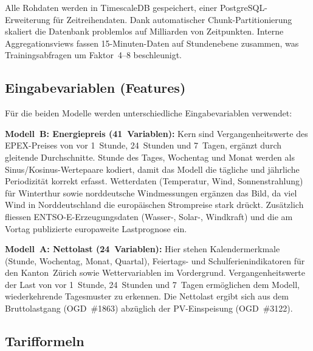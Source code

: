 \documentclass[sigconf]{acmart}
\begin{document}
Alle Rohdaten werden in TimescaleDB gespeichert, einer
PostgreSQL-Erweiterung f\"ur Zeitreihendaten.
Dank automatischer Chunk-Partitionierung skaliert die Datenbank
problemlos auf Milliarden von Zeitpunkten.
Interne Aggregationsviews fassen 15-Minuten-Daten auf Stunden\-ebene zusammen,
was Trainingsabfragen um Faktor~4--8 beschleunigt.

\subsection{Eingabevariablen (Features)}

F\"ur die beiden Modelle werden unterschiedliche Eingabevariablen verwendet:

\textbf{Modell~B: Energiepreis (41~Variablen):}
Kern sind Vergangenheitswerte des EPEX-Preises von vor 1~Stunde, 24~Stunden
und 7~Tagen, erg\"anzt durch gleitende Durchschnitte.
Stunde des Tages, Wochentag und Monat werden als Sinus/Kosinus-Wertepaare
kodiert, damit das Modell die t\"agliche und j\"ahrliche Periodizit\"at
korrekt erfasst.
Wetterdaten (Temperatur, Wind, Sonnenstrahlung) f\"ur Winterthur sowie
norddeutsche Windmessungen erg\"anzen das Bild, da viel Wind in
Norddeutschland die europ\"aischen Strompreise stark dr\"uckt.
Zus\"atzlich fliessen ENTSO-E-Erzeugungsdaten (Wasser-, Solar-, Windkraft)
und die am Vortag publizierte europaweite Lastprognose ein.

\textbf{Modell~A: Nettolast (24~Variablen):}
Hier stehen Kalendermerkmale (Stunde, Wochentag, Monat, Quartal),
Feiertags- und Schulferienindikatoren f\"ur den Kanton~Z\"urich sowie
Wettervariablen im Vordergrund.
Vergangenheitswerte der Last von vor 1~Stunde, 24~Stunden und 7~Tagen
erm\"oglichen dem Modell, wiederkehrende Tagesmuster zu erkennen.
Die Nettolast ergibt sich aus dem Bruttolastgang (OGD~\#1863) abz\"uglich
der PV-Einspeisung (OGD~\#3122).

\subsection{Tarifformeln}
\label{sec:tariff}
\end{document}
